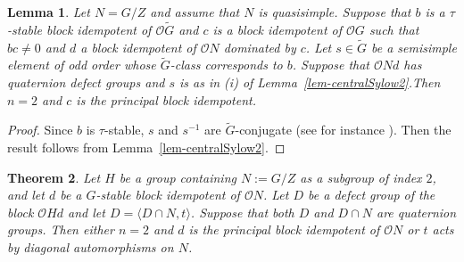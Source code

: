 \documentclass{amsart}
\theoremstyle{plain}\newtheorem{Theorem}{Theorem}[section]
\theoremstyle{plain}\newtheorem{Conjecture}[Theorem]{Conjecture}
\theoremstyle{plain}\newtheorem{Corollary}[Theorem]{Corollary}
\theoremstyle{plain}\newtheorem{Lemma}[Theorem]{Lemma}
\theoremstyle{plain}\newtheorem{Proposition}[Theorem]{Proposition}
\theoremstyle{definition}\newtheorem{Definition}[Theorem]{Definition}
\theoremstyle{definition}\newtheorem{Example}[Theorem]{Example}
\theoremstyle{definition}\newtheorem{Examples}[Theorem]{Examples}
\theoremstyle{definition}\newtheorem{Exercise}[Theorem]{Exercise}
\theoremstyle{definition}\newtheorem{Notation}[Theorem]{Notation}
\theoremstyle{definition}\newtheorem{Remark}[Theorem]{Remark}
\theoremstyle{definition}\newtheorem{Remarks}[Theorem]{Remarks}
\def\CO{{\mathcal{O}}}    \def\OPE{{\mathcal{O}(P\rtimes E)}}
\def\GL{\mathrm{GL}}
\def\GU{\mathrm{GU}}
\newcommand{\wt}{\widetilde}
\numberwithin{equation}{section}
\begin{document}
\begin{Lemma} \label{lem-notaustable}  Let $N=G/Z$  and assume that $N$ is quasisimple.
Suppose that   $b$ is a $\tau$-stable  block idempotent of $\CO \wt{G} $    and $c$  is a block idempotent of   $\CO G $  such that $bc \ne 0$  and $d$ a  block idempotent of $\CO  N $ dominated by  $c$. Let $s \in \wt{G} $  be a semisimple element  of  odd order  whose $\wt{G}$-class corresponds to $b$.  Suppose that   $\CO  N d$  has 
quaternion  defect groups   and  $s$ is as in (i) of Lemma~\ref{lem-centralSylow2}.Then   $n=2$  and $c $ is the principal  block idempotent.
\end{Lemma}

\begin{proof}   Since   $b$   is  $\tau$-stable,  $ s$ and $s^{-1}$  are 
$\wt{G}$-conjugate (see for instance \cite[Lem.~4.2]{SriVin}).  Then the result follows from Lemma~\ref{lem-centralSylow2}.

\end{proof}


\begin{Theorem}   Let $H$ be  a group containing $ N:=G/Z$ as a subgroup of index $2$, and let $d$ be a $G$-stable block idempotent of $\CO  N $. Let $D$  be  a defect group of  the block $\CO Hd $ and   let  $D=\langle  D\cap  N, t\rangle $. 
Suppose that   both $D$ and $D\cap   N$  are quaternion groups.    Then either  $n=2 $ and $d$ is the principal block idempotent of  $\CO  N $ or $t$ acts by diagonal automorphisms on $ N$. %
\end{Theorem}
\end{document}
